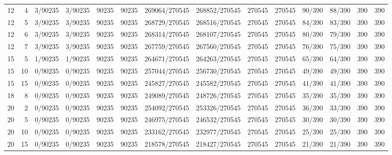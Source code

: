 \begin{tabular}{rrllrrllrrllrr}
12 &  4 &         3/90235 &    3/90235 &          90235 &      90235 & 269064/270545 & 268852/270545 &         270545 &     270545 &      90/390 &     88/390 &        390 &        390 \\
12 &  5 &         3/90235 &    3/90235 &          90235 &      90235 & 268729/270545 & 268516/270545 &         270545 &     270545 &      84/390 &     83/390 &        390 &        390 \\
12 &  6 &         3/90235 &    3/90235 &          90235 &      90235 & 268314/270545 & 268107/270545 &         270545 &     270545 &      80/390 &     79/390 &        390 &        390 \\
12 &  7 &         3/90235 &    3/90235 &          90235 &      90235 & 267759/270545 & 267560/270545 &         270545 &     270545 &      76/390 &     75/390 &        390 &        390 \\
15 &  5 &         1/90235 &    1/90235 &          90235 &      90235 & 264671/270545 & 264263/270545 &         270545 &     270545 &      65/390 &     64/390 &        390 &        390 \\
15 & 10 &         0/90235 &    0/90235 &          90235 &      90235 & 257044/270545 & 256730/270545 &         270545 &     270545 &      49/390 &     49/390 &        390 &        390 \\
15 & 15 &         0/90235 &    0/90235 &          90235 &      90235 & 245827/270545 & 245582/270545 &         270545 &     270545 &      41/390 &     41/390 &        390 &        390 \\
18 &  8 &         0/90235 &    0/90235 &          90235 &      90235 & 249089/270545 & 248726/270545 &         270545 &     270545 &      35/390 &     35/390 &        390 &        390 \\
20 &  2 &         0/90235 &    0/90235 &          90235 &      90235 & 254092/270545 & 253326/270545 &         270545 &     270545 &      36/390 &     33/390 &        390 &        390 \\
20 &  5 &         0/90235 &    0/90235 &          90235 &      90235 & 246975/270545 & 246532/270545 &         270545 &     270545 &      30/390 &     30/390 &        390 &        390 \\
20 & 10 &         0/90235 &    0/90235 &          90235 &      90235 & 233162/270545 & 232977/270545 &         270545 &     270545 &      25/390 &     25/390 &        390 &        390 \\
20 & 15 &         0/90235 &    0/90235 &          90235 &      90235 & 218578/270545 & 218427/270545 &         270545 &     270545 &      21/390 &     21/390 &        390 &        390 \\

\end{tabular}
